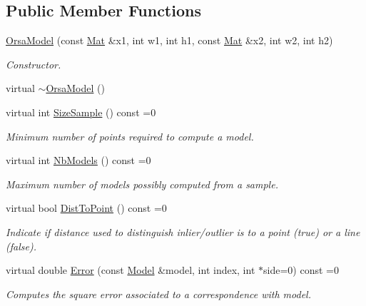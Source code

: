 \subsection*{Public Member Functions}
\begin{DoxyCompactItemize}
\item 
\hyperlink{classorsa_1_1OrsaModel_aa105bf621d52f6cd027f8cf32d1c9870}{Orsa\+Model} (const \hyperlink{classorsa_1_1OrsaModel_a522135c09871e55e3757780cc1ce57f5}{Mat} \&x1, int w1, int h1, const \hyperlink{classorsa_1_1OrsaModel_a522135c09871e55e3757780cc1ce57f5}{Mat} \&x2, int w2, int h2)
\begin{DoxyCompactList}\small\item\em Constructor. \end{DoxyCompactList}\item 
virtual \hyperlink{classorsa_1_1OrsaModel_af4acb7fcac10b31b641727cdb4a09d25}{$\sim$\+Orsa\+Model} ()
\item 
virtual int \hyperlink{classorsa_1_1OrsaModel_a3d2e0a09f6ddc02c3b9ee85a1ceb1ee7}{Size\+Sample} () const =0
\begin{DoxyCompactList}\small\item\em Minimum number of points required to compute a model. \end{DoxyCompactList}\item 
virtual int \hyperlink{classorsa_1_1OrsaModel_a4567e2e9a7d39e2bcbbc9af9e9d9ddc7}{Nb\+Models} () const =0
\begin{DoxyCompactList}\small\item\em Maximum number of models possibly computed from a sample. \end{DoxyCompactList}\item 
virtual bool \hyperlink{classorsa_1_1OrsaModel_abf92fafced441e3458792629e0054b37}{Dist\+To\+Point} () const =0
\begin{DoxyCompactList}\small\item\em Indicate if distance used to distinguish inlier/outlier is to a point (true) or a line (false). \end{DoxyCompactList}\item 
virtual double \hyperlink{classorsa_1_1OrsaModel_a397468af3d73039fadc513d9db343104}{Error} (const \hyperlink{classorsa_1_1OrsaModel_aadc7e7fc0708ca6bc623e75cdc66b5e8}{Model} \&model, int index, int $\ast$side=0) const =0
\begin{DoxyCompactList}\small\item\em Computes the square error associated to a correspondence with model. \end{DoxyCompactList}\item 

\end{DoxyCompactItemize}
